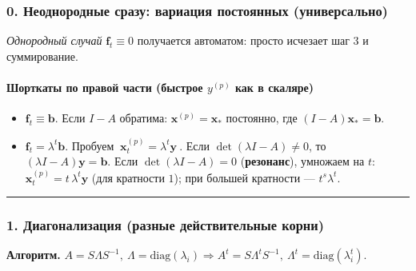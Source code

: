 \subsubsection*{0. Неоднородные сразу: вариация постоянных (универсально)}
\noindent\emph{Однородный случай} \(\mathbf{f}_t\equiv0\) получается автоматом: просто исчезает шаг 3 и суммирование.

\paragraph{Шорткаты по правой части (быстрое \(y^{(p)}\) как в скаляре)}
\begin{itemize}
  \item \(\mathbf{f}_t\equiv\mathbf{b}\). Если \(I-A\) обратима: \(\mathbf{x}^{(p)}=\mathbf{x}_*\) постоянно, где \((I-A)\mathbf{x}_*=\mathbf{b}\).
  \item \(\mathbf{f}_t=\lambda^t\mathbf{b}\). Пробуем \(\boxed{\ \mathbf{x}^{(p)}_t=\lambda^t\mathbf{y}\ }\). Если \(\det(\lambda I-A)\neq0\), то \((\lambda I-A)\mathbf{y}=\mathbf{b}\).
        Если \(\det(\lambda I-A)=0\) (\textbf{резонанс}), умножаем на \(t\): \(\mathbf{x}^{(p)}_t=t\,\lambda^t\mathbf{y}\) (для кратности \(1\)); при большей кратности — \(t^s\lambda^t\).
\end{itemize}

\bigskip\hrule\bigskip

\subsubsection*{1. Диагонализация (разные действительные корни)}
\textbf{Алгоритм.}
\(A=S\Lambda S^{-1},\ \Lambda=\mathrm{diag}(\lambda_i)\Rightarrow \boxed{A^t=S\Lambda^t S^{-1}},\ \Lambda^t=\mathrm{diag}(\lambda_i^t).\)

